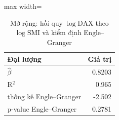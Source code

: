\begin{table}[H]
\centering\small
\caption{Mở rộng: hồi quy $\log\mathrm{DAX}$ theo $\log\mathrm{SMI}$ và kiểm định Engle--Granger}\label{tab:tab_b12_ext_cointegration}
\begin{adjustbox}{max width=\linewidth}
\begin{tabular}{lr}
\toprule
Đại lượng & Giá trị \\
\midrule
$\hat{\beta}$ & 0.8203 \\
R$^{2}$ & 0.965 \\
thống kê Engle–Granger & -2.502 \\
p-value Engle–Granger & 0.2781 \\
\bottomrule
\end{tabular}
\end{adjustbox}
\end{table}
